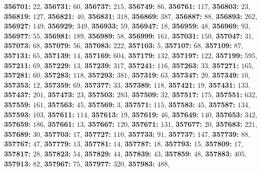 \textsf{\bfseries 356701:} $22$, \textsf{\bfseries 356731:} $60$, \textsf{\bfseries 356737:} $215$, \textsf{\bfseries 356749:} $86$, \textsf{\bfseries 356761:} $117$, \textsf{\bfseries 356803:} $23$, \textsf{\bfseries 356819:} $127$, \textsf{\bfseries 356821:} $40$, \textsf{\bfseries 356831:} $318$, \textsf{\bfseries 356869:} $387$, \textsf{\bfseries 356887:} $88$, \textsf{\bfseries 356893:} $262$, \textsf{\bfseries 356927:} $149$, \textsf{\bfseries 356929:} $349$, \textsf{\bfseries 356933:} $59$, \textsf{\bfseries 356947:} $18$, \textsf{\bfseries 356959:} $48$, \textsf{\bfseries 356969:} $93$, \textsf{\bfseries 356977:} $55$, \textsf{\bfseries 356981:} $189$, \textsf{\bfseries 356989:} $58$, \textsf{\bfseries 356999:} $161$, \textsf{\bfseries 357031:} $150$, \textsf{\bfseries 357047:} $31$, \textsf{\bfseries 357073:} $68$, \textsf{\bfseries 357079:} $56$, \textsf{\bfseries 357083:} $222$, \textsf{\bfseries 357103:} $5$, \textsf{\bfseries 357107:} $68$, \textsf{\bfseries 357109:} $87$, \textsf{\bfseries 357131:} $65$, \textsf{\bfseries 357139:} $14$, \textsf{\bfseries 357169:} $604$, \textsf{\bfseries 357179:} $132$, \textsf{\bfseries 357197:} $122$, \textsf{\bfseries 357199:} $595$, \textsf{\bfseries 357211:} $69$, \textsf{\bfseries 357229:} $13$, \textsf{\bfseries 357239:} $317$, \textsf{\bfseries 357241:} $116$, \textsf{\bfseries 357263:} $33$, \textsf{\bfseries 357271:} $165$, \textsf{\bfseries 357281:} $60$, \textsf{\bfseries 357283:} $118$, \textsf{\bfseries 357293:} $381$, \textsf{\bfseries 357319:} $63$, \textsf{\bfseries 357347:} $20$, \textsf{\bfseries 357349:} $10$, \textsf{\bfseries 357353:} $12$, \textsf{\bfseries 357359:} $69$, \textsf{\bfseries 357377:} $33$, \textsf{\bfseries 357389:} $118$, \textsf{\bfseries 357421:} $19$, \textsf{\bfseries 357431:} $133$, \textsf{\bfseries 357437:} $201$, \textsf{\bfseries 357473:} $23$, \textsf{\bfseries 357503:} $283$, \textsf{\bfseries 357509:} $32$, \textsf{\bfseries 357517:} $175$, \textsf{\bfseries 357551:} $632$, \textsf{\bfseries 357559:} $161$, \textsf{\bfseries 357563:} $45$, \textsf{\bfseries 357569:} $3$, \textsf{\bfseries 357571:} $115$, \textsf{\bfseries 357583:} $45$, \textsf{\bfseries 357587:} $134$, \textsf{\bfseries 357593:} $103$, \textsf{\bfseries 357611:} $114$, \textsf{\bfseries 357613:} $19$, \textsf{\bfseries 357619:} $46$, \textsf{\bfseries 357649:} $140$, \textsf{\bfseries 357653:} $342$, \textsf{\bfseries 357659:} $186$, \textsf{\bfseries 357661:} $13$, \textsf{\bfseries 357667:} $120$, \textsf{\bfseries 357671:} $131$, \textsf{\bfseries 357677:} $20$, \textsf{\bfseries 357683:} $221$, \textsf{\bfseries 357689:} $30$, \textsf{\bfseries 357703:} $17$, \textsf{\bfseries 357727:} $110$, \textsf{\bfseries 357733:} $91$, \textsf{\bfseries 357737:} $147$, \textsf{\bfseries 357739:} $88$, \textsf{\bfseries 357767:} $47$, \textsf{\bfseries 357779:} $13$, \textsf{\bfseries 357781:} $14$, \textsf{\bfseries 357787:} $18$, \textsf{\bfseries 357793:} $15$, \textsf{\bfseries 357809:} $17$, \textsf{\bfseries 357817:} $28$, \textsf{\bfseries 357823:} $54$, \textsf{\bfseries 357829:} $44$, \textsf{\bfseries 357839:} $43$, \textsf{\bfseries 357859:} $48$, \textsf{\bfseries 357883:} $405$, \textsf{\bfseries 357913:} $82$, \textsf{\bfseries 357967:} $75$, \textsf{\bfseries 357977:} $320$, \textsf{\bfseries 357983:} $488$, 
